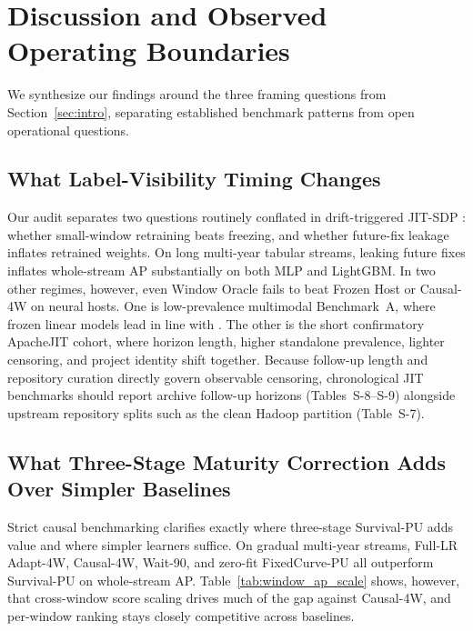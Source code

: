\documentclass[pdflatex,sn-basic]{sn-jnl}
\theoremstyle{definition}
\theoremstyle{plain}
\begin{document}
\section{Discussion and Observed Operating Boundaries}
\label{sec:discussion}

We synthesize our findings around the three framing questions from Section~\ref{sec:intro}, separating established benchmark patterns from open operational questions.

\subsection{What Label-Visibility Timing Changes}
\label{sec:disc_timing}

Our audit separates two questions routinely conflated in drift-triggered JIT-SDP \citep{pote2026adaptive}: whether small-window retraining beats freezing, and whether future-fix leakage inflates retrained weights. On long multi-year tabular streams, leaking future fixes inflates whole-stream AP substantially on both MLP and LightGBM. In two other regimes, however, even Window Oracle fails to beat Frozen Host or Causal-4W on neural hosts. One is low-prevalence multimodal Benchmark~A, where frozen linear models lead in line with \citet{zeng2021deep}. The other is the short confirmatory ApacheJIT cohort, where horizon length, higher standalone prevalence, lighter censoring, and project identity shift together. Because follow-up length and repository curation directly govern observable censoring, chronological JIT benchmarks should report archive follow-up horizons (Tables~S-8--S-9) alongside upstream repository splits such as the clean Hadoop partition (Table~S-7).

\subsection{What Three-Stage Maturity Correction Adds Over Simpler Baselines}
\label{sec:disc_increment}

Strict causal benchmarking clarifies exactly where three-stage Survival-PU adds value and where simpler learners suffice. On gradual multi-year streams, Full-LR Adapt-4W, Causal-4W, Wait-90, and zero-fit FixedCurve-PU all outperform Survival-PU on whole-stream AP. Table~\ref{tab:window_ap_scale} shows, however, that cross-window score scaling drives much of the gap against Causal-4W, and per-window ranking stays closely competitive across baselines.
\end{document}
